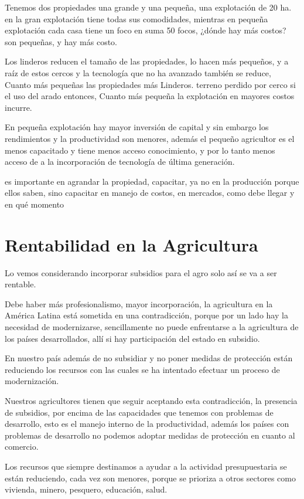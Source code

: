 \documentclass[
  a4paper,
]{article}
\begin{document}
Tenemos dos propiedades una grande y una pequeña, una explotación de 20
ha. en la gran explotación tiene todas sus comodidades, mientras en
pequeña explotación cada casa tiene un foco en suma 50 focos, ¿dónde hay
más costos? son pequeñas, y hay más costo.

Los linderos reducen el tamaño de las propiedades, lo hacen más
pequeños, y a raíz de estos cercos y la tecnología que no ha avanzado
también se reduce, Cuanto más pequeñas las propiedades más Linderos.
terreno perdido por cerco si el uso del arado entonces, Cuanto más
pequeña la explotación en mayores costos incurre.

En pequeña explotación hay mayor inversión de capital y sin embargo los
rendimientos y la productividad son menores, además el pequeño
agricultor es el menos capacitado y tiene menos acceso conocimiento, y
por lo tanto menos acceso de a la incorporación de tecnología de última
generación.

es importante en agrandar la propiedad, capacitar, ya no en la
producción porque ellos saben, sino capacitar en manejo de costos, en
mercados, como debe llegar y en qué momento

\hypertarget{rentabilidad-en-la-agricultura-1}{%
\section{Rentabilidad en la
Agricultura}\label{rentabilidad-en-la-agricultura-1}}

Lo vemos considerando incorporar subsidios para el agro solo así se va a
ser rentable.

Debe haber más profesionalismo, mayor incorporación, la agricultura en
la América Latina está sometida en una contradicción, porque por un lado
hay la necesidad de modernizarse, sencillamente no puede enfrentarse a
la agricultura de los países desarrollados, allí si hay participación
del estado en subsidio.

En nuestro país además de no subsidiar y no poner medidas de protección
están reduciendo los recursos con las cuales se ha intentado efectuar un
proceso de modernización.

Nuestros agricultores tienen que seguir aceptando esta contradicción, la
presencia de subsidios, por encima de las capacidades que tenemos con
problemas de desarrollo, esto es el manejo interno de la productividad,
además los países con problemas de desarrollo no podemos adoptar medidas
de protección en cuanto al comercio.

Los recursos que siempre destinamos a ayudar a la actividad
presupuestaria se están reduciendo, cada vez son menores, porque se
prioriza a otros sectores como vivienda, minero, pesquero, educación,
salud.
\end{document}
